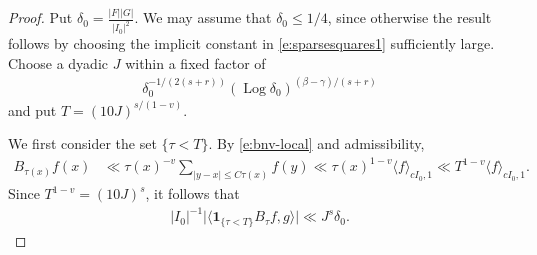 \documentclass[12pt,reqno]{amsart}
\numberwithin{equation}{section}
\theoremstyle{definition}
\theoremstyle{remark}
\newcommand{\Log}{\operatorname{Log}}
\begin{document}
\begin{proof}
Put $\delta_0=\frac{|F||G|}{|I_0|^2}$.  We may assume that
$\delta_0\leq1/4$, since otherwise the result follows by choosing the
implicit constant in \eqref{e:sparsesquares1} sufficiently large.
Choose a dyadic $J$ within a fixed factor of
\begin{align}\label{e:localJchoice}
 \delta_0^{-1/(2(s+r))}
 (\Log\delta_0)^{(\beta-\gamma)/(s+r)}
\end{align}
and put $T=(10J)^{s/(1-v)}$.

We first consider the set $\{\tau<T\}$. By \eqref{e:bnv-local} and admissibility,
\begin{align*}
 B_{\tau(x)}f(x)
 &\ll \tau(x)^{-v}
 \sum_{|y-x|\leq C\tau(x)}f(y)
 \ll \tau(x)^{1-v}\langle f\rangle_{cI_0,1}
 \ll T^{1-v}\langle f\rangle_{cI_0,1}.
\end{align*}
Since $T^{1-v}=(10J)^s$, it follows that
\begin{align}\label{e:smalltau}
 |I_0|^{-1}
 \big|\langle\mathbf1_{\{\tau<T\}}B_\tau f,g\rangle\big|
 \ll J^s\delta_0.
\end{align}


\end{proof}
\end{document}
